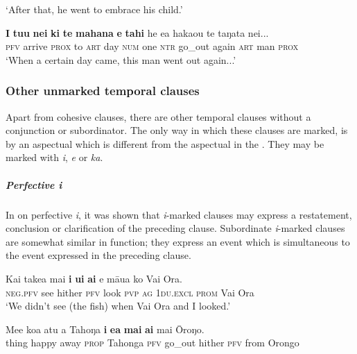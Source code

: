 \glt 
‘After that, he went to embrace his child.’ \textstyleExampleref{[R210.068]} 
\z

\ea\label{ex:11.221}
\gll \textbf{I} \textbf{tu{\ꞌ}u} \textbf{nei} \textbf{ki} \textbf{te} \textbf{mahana} \textbf{e} \textbf{tahi} he e{\ꞌ}a haka{\ꞌ}ou te taŋata nei... \\
\textsc{pfv} arrive \textsc{prox} to \textsc{art} day \textsc{num} one \textsc{ntr} go\_out again \textsc{art} man \textsc{prox} \\

\glt 
‘When a certain day came, this man went out again...’ \textstyleExampleref{[R310.025]}\textstyleExampleref{} 
\z
{}

\subsubsection[Other unmarked temporal clauses ]{Other unmarked temporal clauses} \label{sec:11.6.2.2}
Apart from cohesive clauses, there are other temporal clauses without a conjunction or subordinator. The only way in which these clauses are marked, is by an aspectual which is different from the aspectual in the . They may be marked with \textit{i}, \textit{e} or \textit{ka}.

\subparagraph{Perfective \textit{i}} In  on perfective \textit{i}, it was shown that \textit{i}{}-marked clauses may express a restatement, conclusion or clarification of the preceding clause. Subordinate \textit{i}{}-marked clauses are somewhat similar in function; they express an event which is simultaneous to the event expressed in the preceding clause. 

\ea\label{ex:11.222}
\gll Kai take{\ꞌ}a mai \textbf{i} \textbf{u{\ꞌ}i} \textbf{ai} e māua ko Vai Ora. \\
\textsc{neg.pfv} see hither \textsc{pfv} look \textsc{pvp} \textsc{ag} \textsc{1du.excl} \textsc{prom} Vai Ora \\

\glt 
‘We didn’t see (the fish) when Vai Ora and I looked.’ \textstyleExampleref{[R301.292]} 
\z

\ea\label{ex:11.223}
\gll Me{\ꞌ}e koa atu a Tahoŋa \textbf{i} \textbf{e{\ꞌ}a} \textbf{mai} \textbf{ai} mai {\ꞌ}Ōroŋo. \\
thing happy away \textsc{prop} Tahonga \textsc{pfv} go\_out hither \textsc{pfv} from Orongo \\

